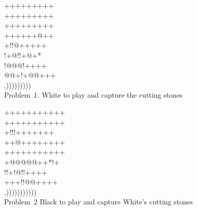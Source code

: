 \documentclass[mcrownvopaper,10pt,twopage,onecolumn,draft,showtrims]{memoir}
\begin{document}
\begin{figure}[ht]
    \begin{minipage}[c]{0.5\linewidth}
        \centering    
        {\gnos%
        +++++++++\\
        +++++++++\\
        +++++++++\\
        ++++++@++\\
        +!!@+++++\\
        !+@!!+@+*\\
        !@@@!++++\\
        @@+!+@@+++\\
        ,)))))))))\\
        }
        Problem\ 1. White to play and capture the cutting stones
    \end{minipage}%
    \begin{minipage}[c]{0.5\linewidth}
        \centering    
        {\gnos%
        +++++++++++\\
        +++++++++++\\
        +!!!+++++++\\
        ++@++++++++\\
        +++++++++++\\
        +@@@@@++*!+\\
        !!+!@!!++++\\
        +++!!@@++++\\
        ,)))))))))))\\
        }
        Problem\ 2 Black to play and capture White's cutting stones
    \end{minipage}
\end{figure}
\end{document}
